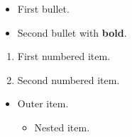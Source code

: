 \begin{itemize}
  \item First bullet.
  \item Second bullet with \textbf{bold}.
\end{itemize}

\begin{enumerate}
  \item First numbered item.
  \item Second numbered item.
\end{enumerate}

\begin{itemize}
  \item Outer item.
  \begin{itemize}
    \item Nested item.
  \end{itemize}
\end{itemize}

